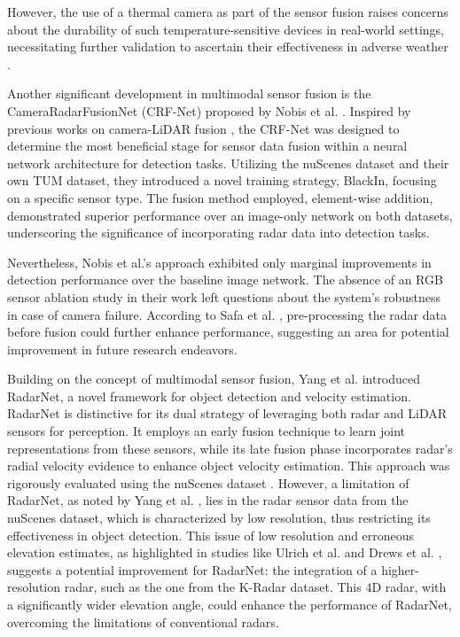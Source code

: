 \documentclass[report.tex]{subfiles}
\begin{document}
    However, the use of a thermal camera as part of the sensor fusion raises concerns about the durability of such temperature-sensitive devices in real-world settings, necessitating further validation to ascertain their effectiveness in adverse weather \cite{zang2019impact}.

    Another significant development in multimodal sensor fusion is the CameraRadarFusionNet (CRF-Net) proposed by Nobis et al. \cite{nobis2019deep}. Inspired by previous works on camera-LiDAR fusion \cite{yu2019multi, caltagirone2019lidar}, the CRF-Net was designed to determine the most beneficial stage for sensor data fusion within a neural network architecture for detection tasks. Utilizing the nuScenes \cite{caesar2020nuscenes} dataset and their own TUM dataset, they introduced a novel training strategy, BlackIn, focusing on a specific sensor type. The fusion method employed, element-wise addition, demonstrated superior performance over an image-only network on both datasets, underscoring the significance of incorporating radar data into detection tasks.

    Nevertheless, Nobis et al.'s approach \cite{nobis2019deep} exhibited only marginal improvements in detection performance over the baseline image network. The absence of an RGB sensor ablation study in their work left questions about the system's robustness in case of camera failure. According to Safa et al. \cite{safa2021fail}, pre-processing the radar data before fusion could further enhance performance, suggesting an area for potential improvement in future research endeavors.

    Building on the concept of multimodal sensor fusion, Yang et al. \cite{yang2020radarnet} introduced RadarNet, a novel framework for object detection and velocity estimation. RadarNet is distinctive for its dual strategy of leveraging both radar and LiDAR sensors for perception. It employs an early fusion technique to learn joint representations from these sensors, while its late fusion phase incorporates radar's radial velocity evidence to enhance object velocity estimation. This approach was rigorously evaluated using the nuScenes dataset \cite{caesar2020nuscenes}. However, a limitation of RadarNet, as noted by Yang et al. \cite{yang2020radarnet}, lies in the radar sensor data from the nuScenes dataset, which is characterized by low resolution, thus restricting its effectiveness in object detection. This issue of low resolution and erroneous elevation estimates, as highlighted in studies like Ulrich et al. \cite{ulrich2021deepreflecs} and Drews et al. \cite{drews2022deepfusion}, suggests a potential improvement for RadarNet: the integration of a higher-resolution radar, such as the one from the K-Radar dataset. This 4D radar, with a significantly wider elevation angle, could enhance the performance of RadarNet, overcoming the limitations of conventional radars.
\end{document}
